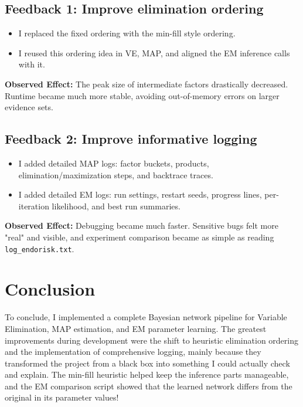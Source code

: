 \documentclass[11pt,a4paper]{article}
\begin{document}
\subsection{Feedback 1: Improve elimination ordering}
\begin{itemize}
    \item I replaced the fixed ordering with the min-fill style ordering.
    \item I reused this ordering idea in VE, MAP, and aligned the EM inference calls with it.
\end{itemize}
\textbf{Observed Effect:} The peak size of intermediate factors drastically decreased. Runtime became much more stable, avoiding out-of-memory errors on larger evidence sets.

\subsection{Feedback 2: Improve informative logging}
\begin{itemize}
    \item I added detailed MAP logs: factor buckets, products, elimination/maximization steps, and backtrace traces.
    \item I added detailed EM logs: run settings, restart seeds, progress lines, per-iteration likelihood, and best run summaries.
\end{itemize}
\textbf{Observed Effect:} Debugging became much faster. Sensitive bugs felt more "real" and visible, and experiment comparison became as simple as reading \texttt{log\_endorisk.txt}.

\section{Conclusion}
To conclude, I implemented a complete Bayesian network pipeline for Variable Elimination, MAP estimation, and EM parameter learning. The greatest improvements during development were the shift to heuristic elimination ordering and the implementation of comprehensive logging, mainly because they transformed the project from a black box into something I could actually check and explain. The min-fill heuristic helped keep the inference parts manageable, and the EM comparison script showed that the learned network differs from the original in its parameter values!
\end{document}
